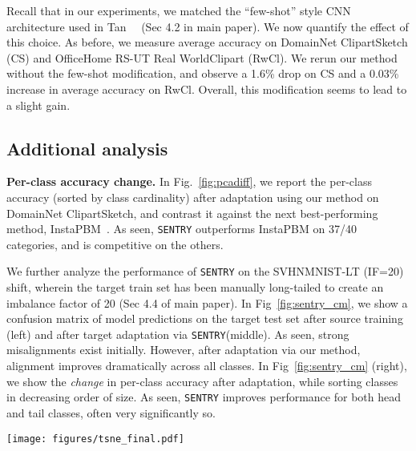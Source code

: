 \documentclass[10pt,twocolumn,letterpaper]{article}
\newcommand{\method}{\texttt{SENTRY}\xspace}
\begin{document}
\noindent Recall that in our experiments, we matched the ``few-shot'' style CNN architecture used in Tan~\etal~\cite{tan2019generalized} (Sec 4.2 in main paper). We now quantify the effect of this choice. As before, we measure average accuracy on DomainNet ClipartSketch (CS) and OfficeHome RS-UT Real WorldClipart (RwCl). We rerun our method without the few-shot modification, and observe a 1.6\% drop on CS and a 0.03\% increase in average accuracy on RwCl. Overall, this modification seems to lead to a slight gain.


\subsection{Additional analysis} 

\par\noindent \textbf{Per-class accuracy change.} In Fig.~\ref{fig:pcadiff}, we report the per-class accuracy (sorted by class cardinality) after adaptation using our method on DomainNet ClipartSketch, and contrast it against the next best-performing method, InstaPBM~\cite{li2020rethinking}. As seen, \method outperforms InstaPBM on 37/40 categories, and is competitive on the others.


We further analyze the performance of \method on the SVHNMNIST-LT (IF=20) shift, wherein the target train set has been manually long-tailed to create an imbalance factor of 20 (Sec 4.4 of main paper). In Fig~\ref{fig:sentry_cm}, we show a confusion matrix of model predictions on the target test set after source training (left) and after target adaptation via \method (middle). As seen, strong misalignments exist initially. However, after adaptation via our method, alignment improves dramatically across all classes. In Fig~\ref{fig:sentry_cm} (right), we show the \emph{change} in per-class accuracy after adaptation, while sorting classes in decreasing order of size. As seen, \method improves performance for both head and tail classes, often very significantly so.

 
\begin{figure*}[t]
    \centering
    \texttt{[image: figures/tsne\_final.pdf]}
    \caption[]{SVHNMNIST: We use t-SNE~\cite{maaten2008visualizing} to visualize features for incorrect (large, opaque circles) and correct (partly transparent circles) model predictions on the imbalanced target train set and source train set before (left) and after (right) adaptation via \method. Colors denote ground truth class, and  and  denote source and target instances. \method is able to overcome significant misalignments for both head classes with many examples ('s and 2's) as well as tail classes with very few examples ('s and 9's).}
    \label{fig:tsne}
\end{figure*}
\end{document}
